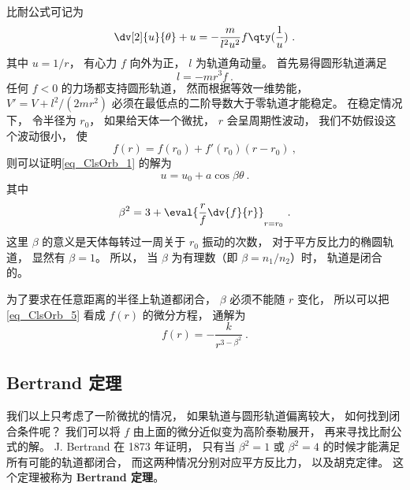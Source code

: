 

比耐公式可记为
\begin{equation}\label{eq_ClsOrb_1}
\dv[2]{u}{\theta} + u = -\frac{m}{l^2 u^2} f\qty(\frac 1u)~.
\end{equation}
其中 $u = 1/r$， 有心力 $f$ 向外为正， $l$ 为轨道角动量。 首先易得圆形轨道满足
\begin{equation}
l = - m r^3 f~.
\end{equation}
任何 $f < 0$ 的力场都支持圆形轨道， 然而根据等效一维势能， $V' = V + l^2/(2mr^2)$ 必须在最低点的二阶导数大于零轨道才能稳定。 在稳定情况下， 令半径为 $r_0$， 如果给天体一个微扰， $r$ 会呈周期性波动， 我们不妨假设这个波动很小， 使
\begin{equation}
f(r) = f(r_0) + f'(r_0)(r-r_0)~,
\end{equation}
则可以证明\autoref{eq_ClsOrb_1} 的解为
\begin{equation}
u = u_0 + a\cos\beta\theta~.
\end{equation}
其中
\begin{equation}\label{eq_ClsOrb_5}
\beta^2 = 3 + \eval{\frac rf \dv{f}{r}}_{r = r_0}~.
\end{equation}
这里 $\beta$ 的意义是天体每转过一周关于 $r_0$ 振动的次数， 对于平方反比力的椭圆轨道， 显然有 $\beta = 1$。 所以， 当 $\beta$ 为有理数（即 $\beta = n_1/n_2$）时， 轨道是闭合的。

为了要求在任意距离的半径上轨道都闭合，  $\beta$ 必须不能随 $r$ 变化， 所以可以把\autoref{eq_ClsOrb_5} 看成 $f(r)$ 的微分方程， 通解为
\begin{equation}
f(r) = - \frac{k}{r^{3-\beta^2}}~.
\end{equation}

\subsection{Bertrand 定理}
我们以上只考虑了一阶微扰的情况， 如果轨道与圆形轨道偏离较大， 如何找到闭合条件呢？ 我们可以将 $f$ 由上面的微分近似变为高阶泰勒展开， 再来寻找比耐公式的解。 J. Bertrand 在 1873 年证明， 只有当 $\beta^2 = 1$ 或 $\beta^2 = 4$ 的时候才能满足所有可能的轨道都闭合， 而这两种情况分别对应平方反比力， 以及胡克定律。 这个定理被称为 \textbf{Bertrand 定理}。
